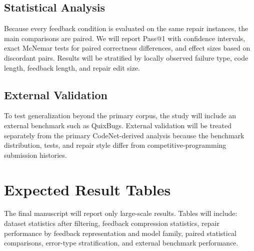 \documentclass[conference]{IEEEtran}
\begin{document}
\subsection{Statistical Analysis}

Because every feedback condition is evaluated on the same repair instances, the main comparisons are paired. We will report Pass@1 with confidence intervals, exact McNemar tests for paired correctness differences, and effect sizes based on discordant pairs. Results will be stratified by locally observed failure type, code length, feedback length, and repair edit size.

\subsection{External Validation}

To test generalization beyond the primary corpus, the study will include an external benchmark such as QuixBugs. External validation will be treated separately from the primary CodeNet-derived analysis because the benchmark distribution, tests, and repair style differ from competitive-programming submission histories.

\section{Expected Result Tables}

The final manuscript will report only large-scale results. Tables will include: dataset statistics after filtering, feedback compression statistics, repair performance by feedback representation and model family, paired statistical comparisons, error-type stratification, and external benchmark performance.
\end{document}
